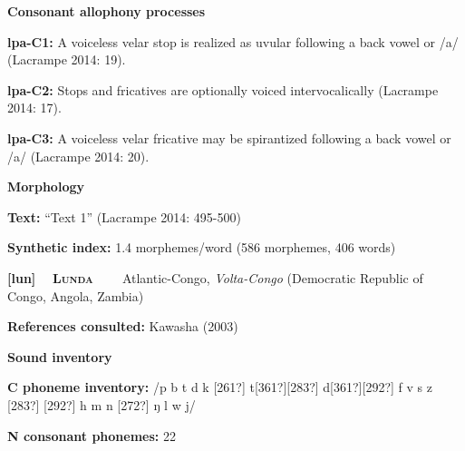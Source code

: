 \begin{styleBody}
\textbf{Consonant allophony processes}
\end{styleBody}

\begin{styleBody}
\textbf{lpa-C1: }A voiceless velar stop is realized as uvular following a back vowel or /a/ (Lacrampe 2014: 19).
\end{styleBody}

\begin{styleBody}
\textbf{lpa-C2: }Stops and fricatives are optionally voiced intervocalically (Lacrampe 2014: 17).
\end{styleBody}

\begin{styleBody}
\textbf{lpa-C3: }A voiceless velar fricative may be spirantized following a back vowel or /a/ (Lacrampe 2014: 20).
\end{styleBody}

\begin{styleBody}
\textbf{Morphology}
\end{styleBody}

\begin{styleBody}
\textbf{Text:} “Text 1” (Lacrampe 2014: 495-500)
\end{styleBody}

\begin{styleBody}
\textbf{Synthetic index: }1.4 morphemes/word (586 morphemes, 406 words)
\end{styleBody}

\clearpage\begin{styleBody}
\textbf{[lun] }\ \ \textbf{\textsc{Lunda\ \ }}\textbf{\ \ }Atlantic-Congo, \textit{Volta-Congo} (Democratic Republic of Congo, Angola, Zambia)
\end{styleBody}

\begin{styleBody}
\textbf{References consulted: }Kawasha (2003)
\end{styleBody}

\begin{styleBody}
\textbf{Sound inventory}
\end{styleBody}

\begin{styleBody}
\textbf{C phoneme inventory:} /p b t d k [261?] t[361?][283?] d[361?][292?] f v s z [283?] [292?] h m n [272?] ŋ l w j/
\end{styleBody}

\begin{styleBody}
\textbf{N consonant phonemes:} 22
\end{styleBody}

